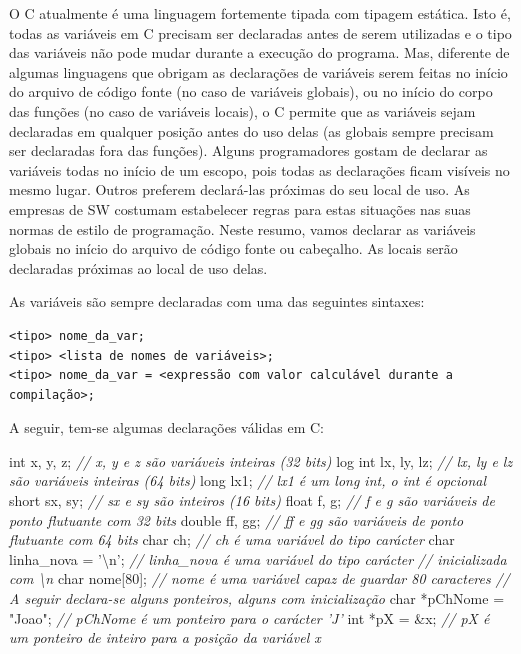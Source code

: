 \documentclass[
]{article}
\newenvironment{Shaded}{}{}
\newcommand{\CharTok}[1]{\textcolor[rgb]{0.25,0.44,0.63}{#1}}
\newcommand{\CommentTok}[1]{\textcolor[rgb]{0.38,0.63,0.69}{\textit{#1}}}
\newcommand{\DataTypeTok}[1]{\textcolor[rgb]{0.56,0.13,0.00}{#1}}
\newcommand{\DecValTok}[1]{\textcolor[rgb]{0.25,0.63,0.44}{#1}}
\newcommand{\NormalTok}[1]{#1}
\newcommand{\StringTok}[1]{\textcolor[rgb]{0.25,0.44,0.63}{#1}}
\begin{document}
O C atualmente é uma linguagem fortemente tipada com tipagem estática.
Isto é, todas as variáveis em C precisam ser declaradas antes de serem
utilizadas e o tipo das variáveis não pode mudar durante a execução do
programa. Mas, diferente de algumas linguagens que obrigam as
declarações de variáveis serem feitas no início do arquivo de código
fonte (no caso de variáveis globais), ou no início do corpo das funções
(no caso de variáveis locais), o C permite que as variáveis sejam
declaradas em qualquer posição antes do uso delas (as globais sempre
precisam ser declaradas fora das funções). Alguns programadores gostam
de declarar as variáveis todas no início de um escopo, pois todas as
declarações ficam visíveis no mesmo lugar. Outros preferem declará-las
próximas do seu local de uso. As empresas de SW costumam estabelecer
regras para estas situações nas suas normas de estilo de programação.
Neste resumo, vamos declarar as variáveis globais no início do arquivo
de código fonte ou cabeçalho. As locais serão declaradas próximas ao
local de uso delas.

As variáveis são sempre declaradas com uma das seguintes sintaxes:

\begin{verbatim}
<tipo> nome_da_var;
<tipo> <lista de nomes de variáveis>;
<tipo> nome_da_var = <expressão com valor calculável durante a compilação>;
\end{verbatim}

A seguir, tem-se algumas declarações válidas em C:

\begin{Shaded}
\begin{Highlighting}[]
\DataTypeTok{int}\NormalTok{ x, y, z;       }\CommentTok{// x, y e z são variáveis inteiras (32 bits)}
\NormalTok{log }\DataTypeTok{int}\NormalTok{ lx, ly, lz;    }\CommentTok{// lx, ly e lz são variáveis inteiras (64 bits)}
\DataTypeTok{long}\NormalTok{ lx1;          }\CommentTok{// lx1 é um long int, o int é opcional}
\DataTypeTok{short}\NormalTok{ sx, sy;      }\CommentTok{// sx e sy são inteiros (16 bits)}
\DataTypeTok{float}\NormalTok{ f, g;        }\CommentTok{// f e g são variáveis de ponto flutuante com 32 bits}
\DataTypeTok{double}\NormalTok{ ff, gg;     }\CommentTok{// ff e gg são variáveis de ponto flutuante com 64 bits}
\DataTypeTok{char}\NormalTok{ ch;           }\CommentTok{// ch é uma variável do tipo carácter}
\DataTypeTok{char}\NormalTok{ linha_nova = }\CharTok{'\textbackslash{}n'}\NormalTok{; }\CommentTok{// linha_nova é uma variável do tipo carácter}
                        \CommentTok{// inicializada com \textbackslash{}n}
\DataTypeTok{char}\NormalTok{ nome[}\DecValTok{80}\NormalTok{];          }\CommentTok{// nome é uma variável capaz de guardar 80 caracteres}
\CommentTok{// A seguir declara-se alguns ponteiros, alguns com inicialização}
\DataTypeTok{char}\NormalTok{ *pChNome = }\StringTok{"Joao"}\NormalTok{; }\CommentTok{// pChNome é um ponteiro para o carácter 'J'}
\DataTypeTok{int}\NormalTok{ *pX = &x;      }\CommentTok{// pX é um ponteiro de inteiro para a posição da variável x}
\end{Highlighting}
\end{Shaded}
\end{document}
